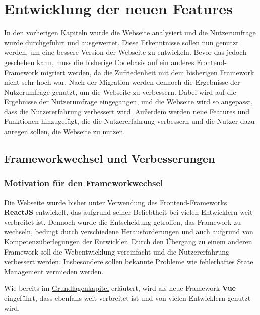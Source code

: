 
\chapter{Entwicklung der neuen Features}
\label{chapter:6}


In den vorherigen Kapiteln wurde die Webseite analysiert und die Nutzerumfrage wurde durchgeführt und ausgewertet. Diese Erkenntnisse sollen nun genutzt werden, um eine bessere Version der Webseite zu entwickeln. Bevor das jedoch geschehen kann, muss die bisherige Codebasis auf ein anderes Frontend-Framework migriert werden, da die Zufriedenheit mit dem bisherigen Framework nicht sehr hoch war. Nach der Migration werden dennoch die Ergebnisse der Nutzerumfrage genutzt, um die Webseite zu verbessern. Dabei wird auf die Ergebnisse der Nutzerumfrage eingegangen, und die Webseite wird so angepasst, dass die Nutzererfahrung verbessert wird. Außerdem werden neue Features und Funktionen hinzugefügt, die die Nutzererfahrung verbessern und die Nutzer dazu anregen sollen, die Webseite zu nutzen.

\section{Frameworkwechsel und Verbesserungen}

\subsection{Motivation für den Frameworkwechsel}

Die Webseite wurde bisher unter Verwendung des Frontend-Frameworks \textbf{ReactJS} entwickelt, das aufgrund seiner Beliebtheit bei vielen Entwicklern weit verbreitet ist. Dennoch wurde die Entscheidung getroffen, das Framework zu wechseln, bedingt durch verschiedene Herausforderungen und auch aufgrund von Kompetenzüberlegungen der Entwickler. Durch den Übergang zu einem anderen Framework soll die Webentwicklung vereinfacht und die Nutzererfahrung verbessert werden. Insbesondere sollen bekannte Probleme wie fehlerhaftes State Management vermieden werden.

Wie bereits im \hyperref[chapter:3-frontend-frameworks]{Grundlagenkapitel} erläutert, wird als neue Framework \textbf{Vue} eingeführt, dass ebenfalls weit verbreitet ist und von vielen Entwicklern genutzt wird.

